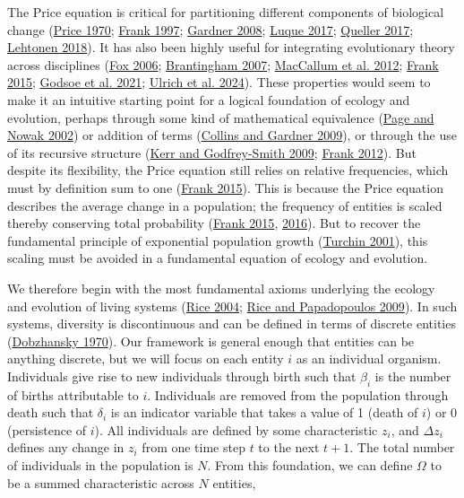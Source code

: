 \documentclass[
]{article}
\begin{document}
The Price equation is critical for partitioning different components of
biological change (\protect\hyperlink{ref-Price1970}{Price 1970};
\protect\hyperlink{ref-Frank1997}{Frank 1997};
\protect\hyperlink{ref-Gardner2008}{Gardner 2008};
\protect\hyperlink{ref-Luque2016}{Luque 2017};
\protect\hyperlink{ref-Queller2017}{Queller 2017};
\protect\hyperlink{ref-Lehtonen2018}{Lehtonen 2018}). It has also been
highly useful for integrating evolutionary theory across disciplines
(\protect\hyperlink{ref-Fox2006}{Fox 2006};
\protect\hyperlink{ref-Brantingham2007}{Brantingham 2007};
\protect\hyperlink{ref-MacCallum2012}{MacCallum et al. 2012};
\protect\hyperlink{ref-Frank2015}{Frank 2015};
\protect\hyperlink{ref-Godsoe2021}{Godsoe et al. 2021};
\protect\hyperlink{ref-Ulrich2024}{Ulrich et al. 2024}). These
properties would seem to make it an intuitive starting point for a
logical foundation of ecology and evolution, perhaps through some kind
of mathematical equivalence (\protect\hyperlink{ref-Page2002}{Page and
Nowak 2002}) or addition of terms
(\protect\hyperlink{ref-Collins2009}{Collins and Gardner 2009}), or
through the use of its recursive structure
(\protect\hyperlink{ref-Kerr2009}{Kerr and Godfrey-Smith 2009};
\protect\hyperlink{ref-Frank2012}{Frank 2012}). But despite its
flexibility, the Price equation still relies on relative frequencies,
which must by definition sum to one
(\protect\hyperlink{ref-Frank2015}{Frank 2015}). This is because the
Price equation describes the average change in a population; the
frequency of entities is scaled thereby conserving total probability
(\protect\hyperlink{ref-Frank2015}{Frank 2015},
\protect\hyperlink{ref-Frank2016}{2016}). But to recover the fundamental
principle of exponential population growth
(\protect\hyperlink{ref-Turchin2001}{Turchin 2001}), this scaling must
be avoided in a fundamental equation of ecology and evolution.

We therefore begin with the most fundamental axioms underlying the
ecology and evolution of living systems
(\protect\hyperlink{ref-Rice2004}{Rice 2004};
\protect\hyperlink{ref-Rice2009}{Rice and Papadopoulos 2009}). In such
systems, diversity is discontinuous and can be defined in terms of
discrete entities (\protect\hyperlink{ref-Dobzhansky1970}{Dobzhansky
1970}). Our framework is general enough that entities can be anything
discrete, but we will focus on each entity \(i\) as an individual
organism. Individuals give rise to new individuals through birth such
that \(\beta_{i}\) is the number of births attributable to \(i\).
Individuals are removed from the population through death such that
\(\delta_{i}\) is an indicator variable that takes a value of 1 (death
of \(i\)) or 0 (persistence of \(i\)). All individuals are defined by
some characteristic \(z_{i}\), and \(\Delta z_{i}\) defines any change
in \(z_{i}\) from one time step \(t\) to the next \(t + 1\). The total
number of individuals in the population is \(N\). From this foundation,
we can define \(\Omega\) to be a summed characteristic across \(N\)
entities,
\end{document}
